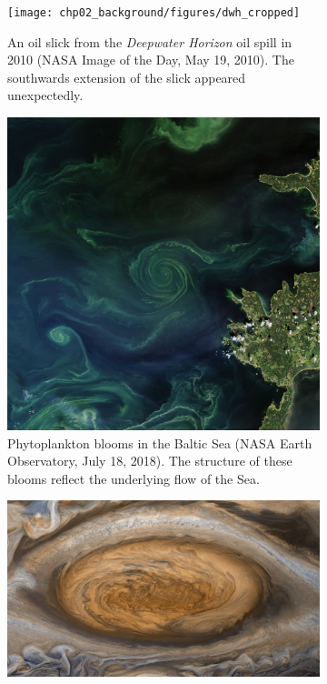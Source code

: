 \begin{figure}
	\begin{center}
		\begin{subfigure}[t]{0.49\textwidth}
			\texttt{[image: chp02\_background/figures/dwh\_cropped]}
			\caption{An oil slick from the \emph{Deepwater Horizon} oil spill in 2010 (NASA Image of the Day, May 19, 2010).
				The southwards extension of the slick appeared unexpectedly.}
			\label{fig:lcs_deepwater}
		\end{subfigure}
		\begin{subfigure}[t]{0.49\textwidth}
			\includegraphics[width=\textwidth]{chp02_background/figures/photoplankton}
			\caption{Phytoplankton blooms in the Baltic Sea (NASA Earth Observatory, July 18, 2018).
				The structure of these blooms reflect the underlying flow of the Sea.}
			\label{fig:lcs_phyto}
		\end{subfigure}
		\begin{subfigure}[t]{\textwidth}
			\includegraphics[width=\textwidth]{chp02_background/figures/red_spot.png}

\end{subfigure}
\end{center}
\end{figure}
